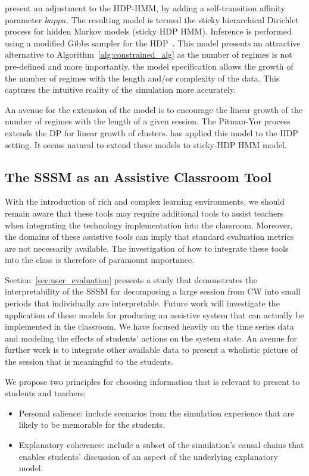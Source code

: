 \cite{fox2009nonparametric, fox2007hierarchical} present an adjustment to the HDP-HMM, by adding a self-transition affinity parameter $kappa$. The resulting model is termed the sticky hierarchical Dirichlet process for hidden Markov models (sticky HDP HMM). Inference is performed using a modified Gibbs sampler for the HDP~\cite{teh2005sharing}. This model presents an attractive alternative to Algorithm~\ref{alg:constrained_alg} as the number of regimes is not pre-defined and more importantly, the model specification allows the growth of the number of regimes with the length and/or complexity of the data. This captures the intuitive reality of the simulation more accurately.

An avenue for the extension of the \citep{fox2009nonparametric} model is to encourage the linear growth of the number of regimes with the length of a given session. The Pitman-Yor process~\citep{pitman1997two} extends the DP for linear growth of clusters. \cite{teh2006hierarchical} has applied this model to the HDP setting. It seems natural to extend these models to \cite{fox2009nonparametric} sticky-HDP HMM model.

\subsection{The SSSM as an Assistive Classroom Tool}\label{sec:class-assistive}
With the introduction of rich and complex learning environments, we should remain aware that these tools may require additional tools to assist teachers when integrating the technology implementation into the classroom. Moreover, the domains of these assistive tools can imply that standard evaluation metrics are not necessarily available. The investigation of how to integrate these tools into the class is therefore of paramount importance.

Section~\ref{sec:user_evaluation} presents a study that demonstrates the interpretability of the SSSM for decomposing a large session from CW into small periods that individually are interpretable. Future work will investigate the application of these models for producing an assistive system that can actually be implemented in the classroom. We have focused heavily on the time series data and modeling the effects of students' actions on the system state. An avenue for further work is to integrate other available data to present a wholistic picture of the session that is meaningful to the students.

We propose two principles for choosing information that is relevant to present to students and teachers:
\begin{itemize}
  \item Personal salience: include scenarios from the simulation experience that are likely to be memorable for the students.
  \item Explanatory coherence: include a subset of the simulation’s causal chains that enables students’ discussion of an aspect of the underlying explanatory model.
\end{itemize}

